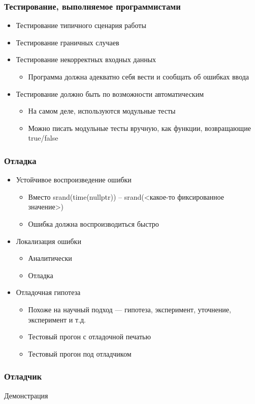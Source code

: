 \documentclass[xetex,mathserif,serif]{beamer}
\begin{document}
	\begin{frame}
		\frametitle{Тестирование, выполняемое программистами}
		\begin{itemize}
			\item Тестирование типичного сценария работы
			\item Тестирование граничных случаев
			\item Тестирование некорректных входных данных
			\begin{itemize}
				\item Программа должна адекватно себя вести и сообщать об ошибках ввода
			\end{itemize}
			\item Тестирование должно быть по возможности автоматическим
			\begin{itemize}
				\item На самом деле, используются модульные тесты
				\item Можно писать модульные тесты вручную, как функции, возвращающие true/false
			\end{itemize}	
		\end{itemize}
	\end{frame}
	
	\begin{frame}
		\frametitle{Отладка}
		\begin{itemize}
			\item Устойчивое воспроизведение ошибки
			\begin{itemize}
				\item Вместо srand(time(nullptr)) – srand(<какое-то фиксированное значение>)
				\item Ошибка должна воспроизводиться быстро
			\end{itemize}
			\item Локализация ошибки
			\begin{itemize}
				\item Аналитически
				\item Отладка
			\end{itemize}
			\item Отладочная гипотеза
			\begin{itemize}
				\item Похоже на научный подход --- гипотеза, эксперимент, уточнение, эксперимент и т.д.
				\item Тестовый прогон с отладочной печатью
				\item Тестовый прогон под отладчиком
			\end{itemize}	
		\end{itemize}
	\end{frame}

	\begin{frame}
		\frametitle{Отладчик}
		\begin{Large}
			\begin{center}
				Демонстрация
			\end{center}
		\end{Large}
	\end{frame}
\end{document}
